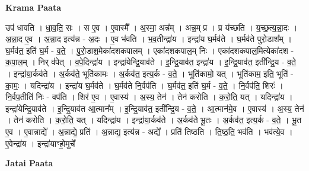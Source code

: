 \documentclass[17pt]{extarticle}
\begin{document}
\textbf{Krama Paata} \newline

उप॑ धावति । धा॒व॒ति॒ सः । स ए॒व । ए॒वास्मै᳚ । अ॒स्मा॒ अन्न᳚म् । अन्न॒म् प्र । प्र य॑च्छति । य॒च्छ॒त्य॒न्ना॒दः । अ॒न्ना॒द ए॒व । अ॒न्ना॒द इत्य॑न्न - अ॒दः । ए॒व भ॑वति । भ॒व॒तीन्द्रा॑य । इन्द्रा॑य घ॒र्मव॑ते । घ॒र्मव॑ते पुरो॒डाश᳚म् । घ॒र्मव॑त॒ इति॑ घ॒र्म - व॒ते॒ । पु॒रो॒डाश॒मेका॑दशकपालम् । एका॑दशकपाल॒म् निः । एका॑दशकपाल॒मित्येका॑दश - क॒पा॒ल॒म् । निर् व॑पेत् । व॒पे॒दिन्द्रा॑य । इन्द्रा॑येन्द्रि॒याव॑ते । इ॒न्द्रि॒याव॑त॒ इन्द्रा॑य । इ॒न्द्रि॒याव॑त॒ इती᳚न्द्रि॒य - व॒ते॒ । इन्द्रा॑या॒र्कव॑ते । अ॒र्कव॑ते॒ भूति॑कामः । अ॒र्कव॑त॒ इत्य॒र्क - व॒ते॒ । भूति॑कामो॒ यत् । भूति॑काम॒ इति॒ भूति॑ - का॒मः॒ । यदिन्द्रा॑य । इन्द्रा॑य घ॒र्मव॑ते । घ॒र्मव॑ते नि॒र्वप॑ति । घ॒र्मव॑त॒ इति॑ घ॒र्म - व॒ते॒ । नि॒र्वप॑ति॒ शिरः॑ । नि॒र्वप॒तीति॑ निः - वप॑ति । शिर॑ ए॒व । ए॒वास्य॑ । अ॒स्य॒ तेन॑ । तेन॑ करोति । क॒रो॒ति॒ यत् । यदिन्द्रा॑य । इन्द्रा॑येन्द्रि॒याव॑ते । इ॒न्द्रि॒याव॑त आ॒त्मान᳚म् । इ॒न्द्रि॒याव॑त॒ इती᳚न्द्रि॒य - व॒ते॒ । आ॒त्मान॑मे॒व । ए॒वास्य॑ । अ॒स्य॒ तेन॑ । तेन॑ करोति । क॒रो॒ति॒ यत् । यदिन्द्रा॑य । इन्द्रा॑या॒र्कव॑ते । अ॒र्कव॑ते भू॒तः । अ॒र्कव॑त॒ इत्य॒र्क - व॒ते॒ । भू॒त ए॒व । ए॒वान्नाद्ये᳚ । अ॒न्नाद्ये॒ प्रति॑ । अ॒न्नाद्य॒ इत्य॑न्न - अद्ये᳚ । प्रति॑ तिष्ठति । ति॒ष्ठ॒ति॒ भव॑ति । भव॑त्ये॒व । ए॒वेन्द्रा॑य । इन्द्रा॑याꣳहो॒मुचे᳚ \newline

\textbf{Jatai Paata} \newline
\end{document}
